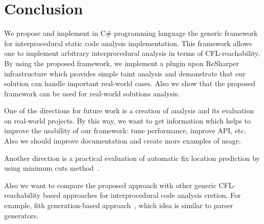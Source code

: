 \section{Conclusion}

We propose and implement in C\# programming language the generic framework for interprocedural static code analysis implementation.
This framework allows one to implement arbitrary interprocedural analysis in terms of CFL-reachability.
By using the proposed framework, we implement a plugin upon ReSharper infrastructure which provides simple taint analysis and demonstrate that our solution can handle important real-world cases.
Also we show that the proposed framework can be used for real-world solutions analysis.

One of the directions for future work is a creation of analysis and its evaluation on real-world projects.
By this way, we want to get information which helps to improve the usability of our framework: tune performance, improve API, etc.
Also we should improve documentation and create more examples of usage.

Another direction is a practical evaluation of automatic fix location prediction by using minimum cuts method~\cite{10.1007/978-3-319-63390-9_27}.

Also we want to compare the proposed approach with other generic CFL-reachability based approaches for interprocedural code analysis cretion. For example, fith generation-based approach~\cite{DBLP:conf/lpar/2017}, which idea is similar to parser generators.
